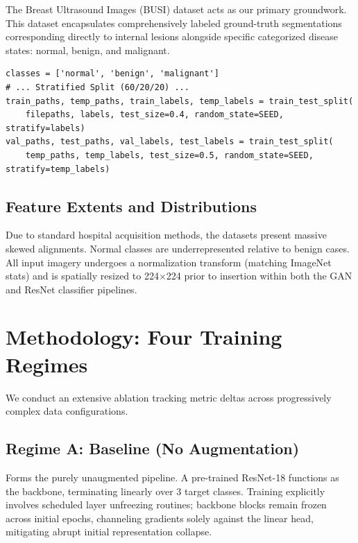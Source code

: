 \documentclass[12pt,a4paper]{article}
\begin{document}
The Breast Ultrasound Images (BUSI) dataset acts as our primary groundwork. This dataset encapsulates comprehensively labeled ground-truth segmentations corresponding directly to internal lesions alongside specific categorized disease states: normal, benign, and malignant.

\begin{lstlisting}[caption={Dataset initialization and splits.}, label=lst:dataset]
classes = ['normal', 'benign', 'malignant']
# ... Stratified Split (60/20/20) ...
train_paths, temp_paths, train_labels, temp_labels = train_test_split(
    filepaths, labels, test_size=0.4, random_state=SEED, stratify=labels)
val_paths, test_paths, val_labels, test_labels = train_test_split(
    temp_paths, temp_labels, test_size=0.5, random_state=SEED, stratify=temp_labels)
\end{lstlisting}

\subsection{Feature Extents and Distributions}

Due to standard hospital acquisition methods, the datasets present massive skewed alignments. Normal classes are underrepresented relative to benign cases. All input imagery undergoes a normalization transform (matching ImageNet stats) and is spatially resized to 224$\times$224 prior to insertion within both the GAN and ResNet classifier pipelines. 



\section{Methodology: Four Training Regimes}

We conduct an extensive ablation tracking metric deltas across progressively complex data configurations.

\subsection{Regime A: Baseline (No Augmentation)}
Forms the purely unaugmented pipeline. A pre-trained ResNet-18 functions as the backbone, terminating linearly over 3 target classes. Training explicitly involves scheduled layer unfreezing routines; backbone blocks remain frozen across initial epochs, channeling gradients solely against the linear head, mitigating abrupt initial representation collapse.
\end{document}
